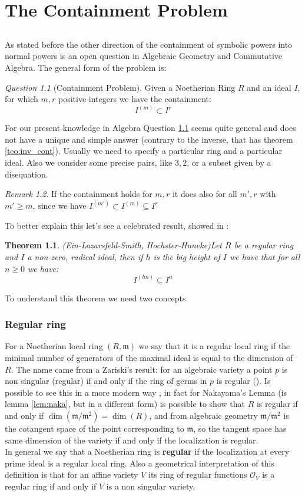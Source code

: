 \documentclass[notitlepage, a4]{book}
\theoremstyle{plain}
\newtheorem{teo}{Theorem}[section]
\theoremstyle{remark}
\newtheorem{rem}{Remark}
\newtheorem{que}[rem]{Question}
\theoremstyle{definition}
\newcommand{\mm}{\mathfrak{m}}
\newcommand{\cont}[2]{ I^{(#1)} \subseteq I^{#2}}
\newcounter{que}
\begin{document}
\chapter{The Containment Problem}
\section*{}
	As stated before the other direction of the containment of symbolic powers into normal powers is an open question in Algebraic Geometry and Commutative Algebra. The general form of the problem is:
	\begin{que}[Containment Problem] \label{que:cont}
		Given a Noetherian Ring $ R $ and an ideal $ I $, for which $ m,r $ positive integers we have the containment:
		$$ I^{(m)} \subset I^r $$
	\end{que}
	For our present knowledge in Algebra Question \ref{que:cont} seems quite general and does not have a unique and simple answer (contrary to the inverse, that has theorem \ref{teo:inv_cont}). Usually we need to specify a particular ring and a particular ideal. Also we consider some precise pairs, like $ 3,2 $, or a subset given by a disequation. 
	\begin{rem}
	If the containment holds for $ m,r $ it does also for all $ m' ,r $ with $ m'\geq m $, since we have $ I^{(m')} \subset \cont{m}{r} $
	\end{rem}
	To better explain this let's see a celebrated result, showed in \cite{HocHun02,EinLazSmi01}:
	\begin{teo}{(Ein-Lazarsfeld-Smith, Hochster-Huneke)}\label{teo:cont:bigh}
	Let $ R $ be a regular ring and $ I $ a non-zero, radical ideal, then if $ h $ is the big height of $ I $ we have that for all $ n \geq 0 $ we have:
	\[ \cont{hn}{n}\]	
	\end{teo} 
	
	To understand this theorem we need two concepts.
	\subsection{Regular ring}
	For a Noetherian local ring $ (R,\mm) $ we say that it is a regular local ring if the minimal number of generators of the maximal ideal is equal to the dimension of $ R $. The name came from a Zariski's result: for an algebraic variety a point $ p $ is non singular (regular) if and only if the ring of germs in $ p $ is regular (\cite{Zar40}). Is possible to see this in a more modern way , in fact for Nakayama's Lemma (is lemma \ref{lem:naka}, but in a different form) is possible to show that $ R $ is regular if and only if $ \dim(\mm / \mm^2 ) = \dim (R) $, and from algebraic geometry $ \mm /\mm^2 $ is the cotangent space of the point corresponding to $ \mm $, so the tangent space has same dimension of the variety if and only if the localization is regular.\\
	In general we say that a Noetherian ring is \textbf{regular} if the localization at every prime ideal is a regular local ring. Also a geometrical interpretation of this definition is that for an affine variety $ V $ its ring of regular functions $ \mathcal{O}_V $ is a regular ring if and only if $ V $ is a non singular variety. 
	
\end{document}
